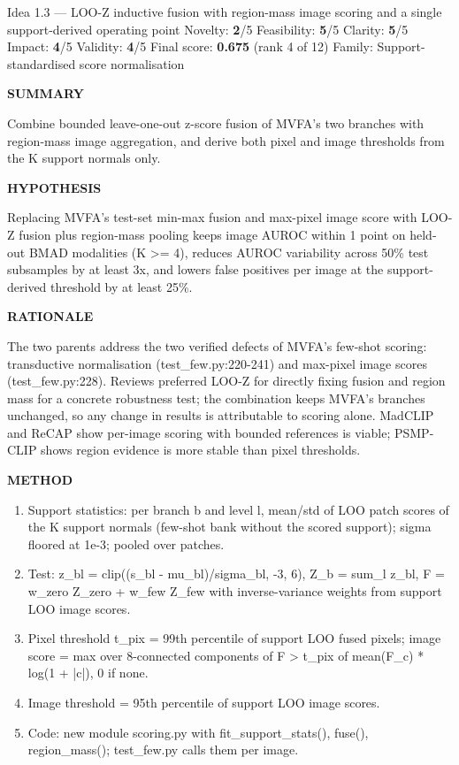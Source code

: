 \documentclass[11pt,a4paper]{article}
\newcommand{\lbl}[1]{{\sffamily\footnotesize\bfseries\color{muted}\MakeUppercase{#1}}\par}
\begin{document}
\begin{ideabox}{Idea 1.3 — LOO-Z inductive fusion with region-mass image scoring and a single support-derived operating point}
{\small Novelty: \textbf{2}/5 \quad Feasibility: \textbf{5}/5 \quad Clarity: \textbf{5}/5 \quad Impact: \textbf{4}/5 \quad Validity: \textbf{4}/5 \quad Final score: \textbf{0.675} (rank 4 of 12) \quad Family: Support-standardised score normalisation}\par\smallskip
\lbl{Summary}Combine bounded leave-one-out z-score fusion of MVFA's two branches with region-mass image aggregation, and derive both pixel and image thresholds from the K support normals only.

\lbl{Hypothesis}Replacing MVFA's test-set min-max fusion and max-pixel image score with LOO-Z fusion plus region-mass pooling keeps image AUROC within 1 point on held-out BMAD modalities (K \textgreater{}= 4), reduces AUROC variability across 50\% test subsamples by at least 3x, and lowers false positives per image at the support-derived threshold by at least 25\%.

\lbl{Rationale}The two parents address the two verified defects of MVFA's few-shot scoring: transductive normalisation (test\_\allowbreak{}few.py:220-241) and max-pixel image scores (test\_\allowbreak{}few.py:228). Reviews preferred LOO-Z for directly fixing fusion and region mass for a concrete robustness test; the combination keeps MVFA's branches unchanged, so any change in results is attributable to scoring alone. MadCLIP and ReCAP show per-image scoring with bounded references is viable; PSMP-CLIP shows region evidence is more stable than pixel thresholds.

\lbl{Method}\begin{enumerate}[leftmargin=1.6em,itemsep=1pt,topsep=2pt]
\item Support statistics: per branch b and level l, mean/std of LOO patch scores of the K support normals (few-shot bank without the scored support); sigma floored at 1e-3; pooled over patches.
\item Test: z\_\allowbreak{}bl = clip((s\_\allowbreak{}bl - mu\_\allowbreak{}bl)/sigma\_\allowbreak{}bl, -3, 6), Z\_\allowbreak{}b = sum\_\allowbreak{}l z\_\allowbreak{}bl, F = w\_\allowbreak{}zero Z\_\allowbreak{}zero + w\_\allowbreak{}few Z\_\allowbreak{}few with inverse-variance weights from support LOO image scores.
\item Pixel threshold t\_\allowbreak{}pix = 99th percentile of support LOO fused pixels; image score = max over 8-connected components of F \textgreater{} t\_\allowbreak{}pix of mean(F\_\allowbreak{}c) * log(1 + |c|), 0 if none.
\item Image threshold = 95th percentile of support LOO image scores.
\item Code: new module scoring.py with fit\_\allowbreak{}support\_\allowbreak{}stats(), fuse(), region\_\allowbreak{}mass(); test\_\allowbreak{}few.py calls them per image.
\end{enumerate}


\end{ideabox}
\end{document}
